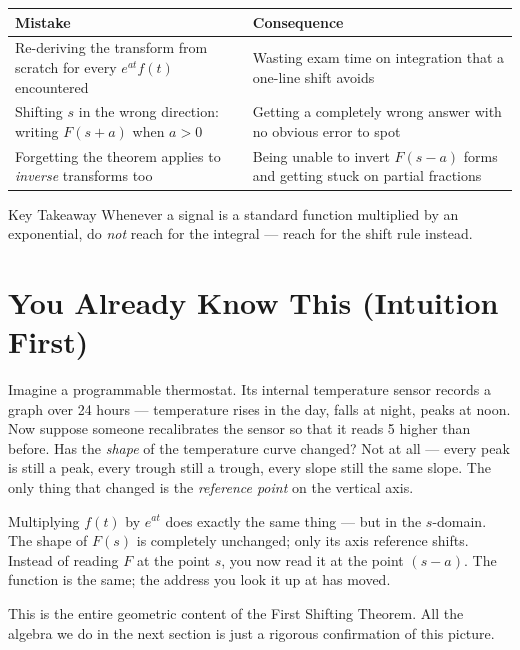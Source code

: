 \documentclass[12pt,a4paper]{article}
\begin{document}
\vspace{0.5em}
\begin{center}
\begin{tabular}{@{}p{6cm}p{7cm}@{}}
\toprule
\textbf{Mistake} & \textbf{Consequence} \\
\midrule
Re-deriving the transform from scratch for every $e^{at}f(t)$ encountered &
Wasting exam time on integration that a one-line shift avoids \\
\midrule
Shifting $s$ in the wrong direction: writing $F(s+a)$ when $a>0$ &
Getting a completely wrong answer with no obvious error to spot \\
\midrule
Forgetting the theorem applies to \emph{inverse} transforms too &
Being unable to invert $F(s-a)$ forms and getting stuck on partial fractions \\
\bottomrule
\end{tabular}
\end{center}

\begin{learnbox}{Key Takeaway}
Whenever a signal is a standard function multiplied by an exponential,
do \emph{not} reach for the integral --- reach for the shift rule instead.
\end{learnbox}

\section{You Already Know This (Intuition First)}

Imagine a programmable thermostat.
Its internal temperature sensor records a graph over 24 hours --- temperature rises in the day,
falls at night, peaks at noon.
Now suppose someone recalibrates the sensor so that it reads 5\textdegree{} higher than before.
Has the \emph{shape} of the temperature curve changed?
Not at all --- every peak is still a peak, every trough still a trough,
every slope still the same slope.
The only thing that changed is the \emph{reference point} on the vertical axis.

Multiplying $f(t)$ by $e^{at}$ does exactly the same thing --- but in the $s$-domain.
The shape of $F(s)$ is completely unchanged; only its axis reference shifts.
Instead of reading $F$ at the point $s$, you now read it at the point $(s-a)$.
The function is the same; the address you look it up at has moved.

This is the entire geometric content of the First Shifting Theorem.
All the algebra we do in the next section is just a rigorous confirmation of this picture.
\end{document}
